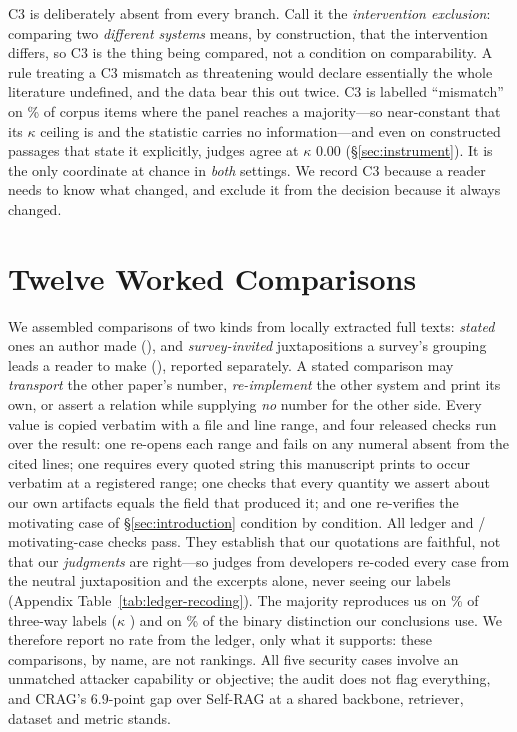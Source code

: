 \documentclass[11pt]{article}
\begin{document}
C3 is deliberately absent from every branch. Call it the \emph{intervention
exclusion}: comparing two \emph{different systems} means, by construction, that
the intervention differs, so C3 is the thing being compared, not a condition on
comparability. A rule treating a C3 mismatch as threatening would declare
essentially the whole literature undefined, and the data bear this out twice.
C3 is labelled ``mismatch'' on \CThreeMismatchMaj\% of corpus items where the
panel reaches a majority---so near-constant that its $\kappa$ ceiling is
\KmaxCThree{} and the statistic carries no information---and even on
constructed passages that state it explicitly, judges agree at $\kappa$ $0.00$
(\S\ref{sec:instrument}). It is the only coordinate at chance in \emph{both}
settings. We record C3 because a reader needs to know what changed, and exclude
it from the decision because it always changed.

\section{Twelve Worked Comparisons}
\label{sec:cases}
\label{sec:evidence}
\label{sec:model}
\label{sec:adversarial}
\label{sec:system}

We assembled comparisons of two kinds from \FlowTexts{} locally extracted full
texts: \emph{stated} ones an author made (\LedgerStated{}), and
\emph{survey-invited} juxtapositions a survey's grouping leads a reader to make
(\LedgerInvited{}), reported separately. A stated comparison may
\emph{transport} the other paper's number, \emph{re-implement} the other system
and print its own, or assert a relation while supplying \emph{no} number for the
other side. Every value is copied verbatim with a file and line range, and four
released checks run over the result: one re-opens each range and fails on any
numeral absent from the cited lines; one requires every quoted string this
manuscript prints to occur verbatim at a registered range; one checks that every
quantity we assert about our own artifacts equals the field that produced it;
and one re-verifies the motivating case of \S\ref{sec:introduction} condition by
condition. All \VerifChecks{} ledger and \MotivPassed{}/\MotivChecks{}
motivating-case checks pass. They establish that our quotations are faithful,
not that our \emph{judgments} are right---so \RecJudges{} judges from
\RecDevs{} developers re-coded every case from the neutral juxtaposition and the
excerpts alone, never seeing our labels (Appendix
Table~\ref{tab:ledger-recoding}). The majority reproduces us on
\RecThreeWayPct\% of three-way labels ($\kappa$ \RecThreeWayK{}) and on
\RecBinaryPct\% of the binary distinction our conclusions use. We therefore
report no rate from the ledger, only what it supports: these comparisons, by
name, are not rankings. All five security cases involve an unmatched attacker
capability or objective; the audit does not flag everything, and CRAG's
$6.9$-point gap over Self-RAG at a shared backbone, retriever, dataset and
metric stands.
\end{document}
